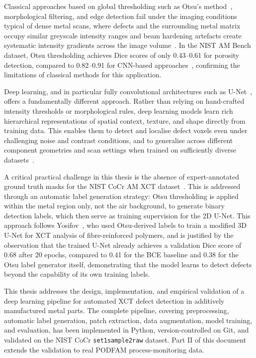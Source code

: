 Classical approaches based on global thresholding such as Otsu's method~\citep{Otsu1979},
morphological filtering, and edge detection fail under the imaging conditions typical of dense metal
scans, where defects and the surrounding metal matrix occupy similar greyscale intensity ranges and
beam hardening artefacts create systematic intensity gradients across the image
volume~\citep{Bellens2021}. In the NIST AM Bench dataset, Otsu thresholding achieves Dice scores of
only 0.43--0.61 for porosity detection, compared to 0.82--0.91 for CNN-based
approaches~\citep{Wong2022}, confirming the limitations of classical methods for this application.

Deep learning, and in particular fully convolutional architectures such as
U-Net~\citep{Ronneberger2015}, offers a fundamentally different approach. Rather than relying on
hand-crafted intensity thresholds or morphological rules, deep learning models learn rich
hierarchical representations of spatial context, texture, and shape directly from training data. This
enables them to detect and localise defect voxels even under challenging noise and contrast
conditions, and to generalise across different component geometries and scan settings when trained on
sufficiently diverse datasets~\citep{Zubayer2023}.

A critical practical challenge in this thesis is the absence of expert-annotated ground truth masks
for the NIST CoCr AM XCT dataset~\citep{NIST_CoCr}. This is addressed through an automatic label
generation strategy: Otsu thresholding is applied within the metal region only, not the air
background, to generate binary detection labels, which then serve as training supervision for the 2D
U-Net. This approach follows Yosifov~\citep{Yosifov2020}, who used Otsu-derived labels to train a
modified 3D U-Net for XCT analysis of fibre-reinforced polymers, and is justified by the observation
that the trained U-Net already achieves a validation Dice score of 0.68 after 20 epochs, compared to
0.41 for the BCE baseline and 0.38 for the Otsu label generator itself, demonstrating that the model
learns to detect defects beyond the capability of its own training labels.

This thesis addresses the design, implementation, and empirical validation of a deep learning
pipeline for automated XCT defect detection in additively manufactured metal parts. The complete
pipeline, covering preprocessing, automatic label generation, patch extraction, data augmentation,
model training, and evaluation, has been implemented in Python, version-controlled on Git, and
validated on the NIST CoCr \texttt{set1sample2raw} dataset. Part II of this document extends the
validation to real PODFAM process-monitoring data.

